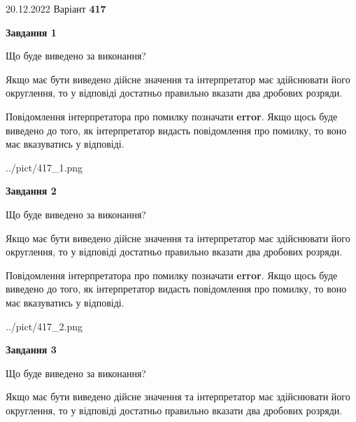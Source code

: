 \documentclass[12pt, ukrainian]{article}
\begin{document}
{20.12.2022 Варіант \No \textbf { 417 }\par}
{
\begin {Large}

{\begin {center}\textbf{Завдання 1}\end {center}}\par
Що буде виведено за виконання? \par

Якщо має бути виведено дійсне значення та інтерпретатор має здійснювати його округлення, 
то у відповіді достатньо правильно вказати два дробових розряди.

Повідомлення інтерпретатора про помилку позначати \textbf{error}.
Якщо щось буде виведено до того, як інтерпретатор видасть повідомлення про помилку, 
то воно має вказуватись у відповіді. \par

\begin{center}
	{../pict/417_1.png}
\end{center}
\newpage

{\begin {center}\textbf{Завдання 2}\end {center}}\par
Що буде виведено за виконання? \par

Якщо має бути виведено дійсне значення та інтерпретатор має здійснювати його округлення, 
то у відповіді достатньо правильно вказати два дробових розряди.

Повідомлення інтерпретатора про помилку позначати \textbf{error}.
Якщо щось буде виведено до того, як інтерпретатор видасть повідомлення про помилку, 
то воно має вказуватись у відповіді. \par

\begin{center}
	{../pict/417_2.png}
\end{center}
\newpage

{\begin {center}\textbf{Завдання 3}\end {center}}\par
Що буде виведено за виконання? \par

Якщо має бути виведено дійсне значення та інтерпретатор має здійснювати його округлення, 
то у відповіді достатньо правильно вказати два дробових розряди.


\end{Large}}
\end{document}
